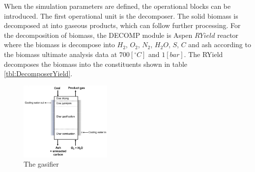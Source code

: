 When the simulation parameters are defined, the operational blocks can be introduced. The first operational unit is the decomposer. The solid biomass is decomposed at into gaseous products, which can follow further processing. For the decomposition of biomass, the DECOMP module is Aspen $RYield$ reactor where the biomass is decompose into $H_2$, $O_2$, $N_2$, $H_2O$, $S$, $C$ and ash according to the biomass ultimate analysis data at $700 [^\circ C]$ and $1 [bar]$. The RYield decomposes the biomass into the constituents shown in table \ref{tbl:DecomposerYield}.

\begin{table}[h!]
	\centering
	\caption{Yields for the RYIELD reactor}
	\label{tbl:DecomposerYield}
\end{table}

\begin{figure}
	\begin{center}
		\includegraphics[width=0.4\textwidth]{Figures/TchermochemicalProcesses/Gasifier.png}
	\end{center}
	\caption{The gasifier}
	\label{fig::Gasifier}
\end{figure}  


